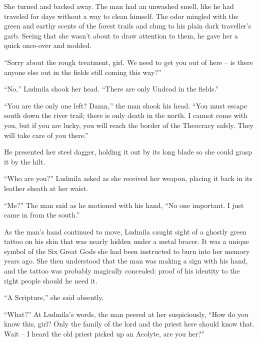  

She turned and backed away. The man had an unwashed smell, like he had traveled for days without a way to clean himself. The odor mingled with the green and earthy scents of the forest trails and clung to his plain dark traveller’s garb. Seeing that she wasn’t about to draw attention to them, he gave her a quick once-over and nodded.

 

“Sorry about the rough treatment, girl. We need to get you out of here – is there anyone else out in the fields still coming this way?”

 

“No,” Ludmila shook her head. “There are only Undead in the fields.”

 

“You are the only one left? Damn,” the man shook his head. “You must escape south down the river trail; there is only death in the north. I cannot come with you, but if you are lucky, you will reach the border of the Theocracy safely. They will take care of you there.”

 

He presented her steel dagger, holding it out by its long blade so she could grasp it by the hilt.

 

“Who are you?” Ludmila asked as she received her weapon, placing it back in its leather sheath at her waist.

 

“Me?” The man said as he motioned with his hand, “No one important. I just came in from the south.”

 

As the man’s hand continued to move, Ludmila caught sight of a ghostly green tattoo on his skin that was nearly hidden under a metal bracer. It was a unique symbol of the Six Great Gods she had been instructed to burn into her memory years ago. She then understood that the man was making a sign with his hand, and the tattoo was probably magically concealed: proof of his identity to the right people should he need it.

 

“A Scripture,” she said absently.

 

“What?” At Ludmila’s words, the man peered at her suspiciously, “How do you know this, girl? Only the family of the lord and the priest here should know that. Wait – I heard the old priest picked up an Acolyte, are you her?”

